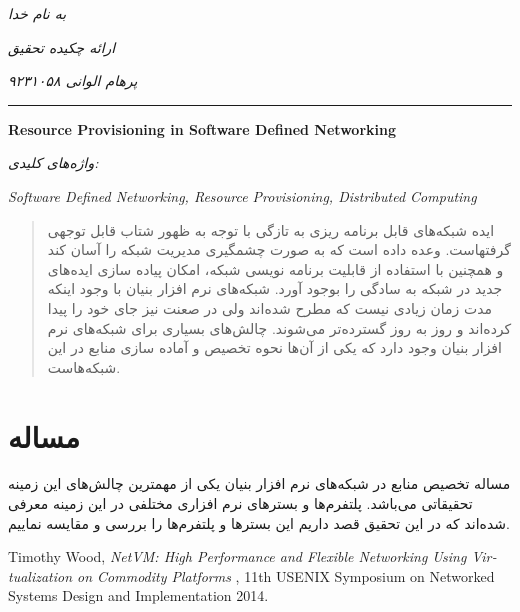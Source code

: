 ﻿\documentclass[11pt]{article}
\begin{document}
\begin{titlepage}
	\centering
	\emph{به نام خدا}\par
	\vspace{.5cm}
	\emph{ارائه چکیده تحقیق}\par
	\vspace{.5cm}
	\emph{پرهام الوانی ۹۲۳۱۰۵۸}\par
	\vspace{.25cm}
	\rule{\textwidth}{1pt}
	\vspace{.25cm}
	\begin{latin}
		{\huge\bfseries Resource Provisioning in Software Defined Networking}\par
	\end{latin}
	\vspace{.5cm}
	\emph{واژه‌های کلیدی:}
	\vspace{.1cm}
	\begin{latin}
		\emph{Software Defined Networking, Resource Provisioning, Distributed Computing}
	\end{latin}
\end{titlepage}
\begin{abstract}
	ایده شبکه‌های قابل برنامه ریزی به تازگی با توجه به ظهور  شتاب قابل توجهی گرفتهاست.
	 وعده داده است که به صورت چشمگیری مدیریت شبکه را آسان کند و همچنین با استفاده از قابلیت برنامه نویسی شبکه، امکان پیاده سازی ایده‌های جدید در شبکه به سادگی را بوجود آورد.
شبکه‌های نرم افزار بنیان با وجود اینکه مدت زمان زیادی نیست که مطرح شده‌اند ولی در صعنت نیز جای خود را پیدا کرده‌اند و روز به روز گسترده‌تر می‌شوند. چالش‌های بسیاری برای شبکه‌های نرم افزار بنیان وجود دارد که یکی از آن‌ها نحوه تخصیص و آماده سازی منابع در این شبکه‌هاست.
\end{abstract}
\section*{مساله}
	مساله تخصیص منابع در شبکه‌های نرم افزار بنیان یکی از مهمترین چالش‌های این زمینه تحقیقاتی می‌باشد. پلتفرم‌ها و بستر‌های نرم افزاری مختلفی در این زمینه معرفی شده‌اند که در این تحقیق قصد داریم این بستر‌ها و پلتفرم‌ها را بررسی و مقایسه نماییم.

\begin{thebibliography}{9}
	\begin{latin}
		Timothy Wood,
		\emph{NetVM: High Performance and Flexible Networking
Using Virtualization on Commodity Platforms },
		11th USENIX Symposium on Networked Systems Design and Implementation
  		2014.
	\end{latin}
\end{thebibliography}
\end{document}
